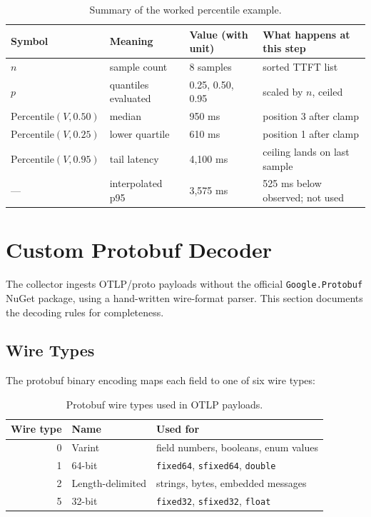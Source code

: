 \documentclass[11pt,a4paper]{article}
\begin{document}
\begin{table}[h!]
\centering
\caption{Summary of the worked percentile example.}
\label{tab:percentile-worked}
\begin{tabular}{@{}llll@{}}
\toprule
Symbol & Meaning & Value (with unit) & What happens at this step \\
\midrule
$n$ & sample count & 8 samples & sorted TTFT list \\
$p$ & quantiles evaluated & 0.25, 0.50, 0.95 & scaled by $n$, ceiled \\
$\text{Percentile}(V, 0.50)$ & median & 950 ms & position 3 after clamp \\
$\text{Percentile}(V, 0.25)$ & lower quartile & 610 ms & position 1 after clamp \\
$\text{Percentile}(V, 0.95)$ & tail latency & 4{,}100 ms & ceiling lands on last sample \\
--- & interpolated p95 & 3{,}575 ms & 525 ms below observed; not used \\
\bottomrule
\end{tabular}
\end{table}

\section{Custom Protobuf Decoder}
\label{sec:proto}

The collector ingests OTLP/proto payloads without the official
\texttt{Google.Protobuf} NuGet package, using a hand-written wire-format
parser.  This section documents the decoding rules for completeness.

\subsection{Wire Types}

The protobuf binary encoding maps each field to one of six wire types:

\begin{table}[h!]
\centering
\caption{Protobuf wire types used in OTLP payloads.}
\begin{tabular}{@{}rll@{}}
\toprule
Wire type & Name & Used for \\
\midrule
0 & Varint & field numbers, booleans, enum values \\
1 & 64-bit & \texttt{fixed64}, \texttt{sfixed64}, \texttt{double} \\
2 & Length-delimited & strings, bytes, embedded messages \\
5 & 32-bit & \texttt{fixed32}, \texttt{sfixed32}, \texttt{float} \\
\bottomrule
\end{tabular}
\end{table}
\end{document}

